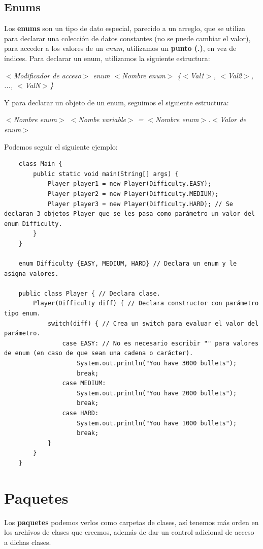 \subsection{Enums}
\hspace{0.55cm}Los \textbf{enums} son un tipo de dato especial, parecido a un arreglo, que se utiliza para declarar una colección de datos constantes (no se puede cambiar el valor), para acceder a los valores de un \textit{enum}, utilizamos un \textbf{punto (.)}, en vez de índices. Para declarar un enum, utilizamos la siguiente estructura:
\begin{center}
	\textit{$<$Modificador de acceso$>$ enum $<$Nombre enum$>$ \{$<$Val1$>$, $<$Val2$>$, ..., $<$ValN$>$\}}
\end{center}

Y para declarar un objeto de un enum, seguimos el siguiente estructura:
\begin{center}
	\textit{$<$Nombre enum$>$ $<$Nombe variable$>$ = $<$Nombre enum$>$.$<$Valor de enum$>$}
\end{center}

Podemos seguir el siguiente ejemplo:
\begin{lstlisting}
    class Main {
        public static void main(String[] args) {
            Player player1 = new Player(Difficulty.EASY);
            Player player2 = new Player(Difficulty.MEDIUM);
            Player player3 = new Player(Difficulty.HARD); // Se declaran 3 objetos Player que se les pasa como parámetro un valor del enum Difficulty.
        }
    }

    enum Difficulty {EASY, MEDIUM, HARD} // Declara un enum y le asigna valores.

    public class Player { // Declara clase.
        Player(Difficulty diff) { // Declara constructor con parámetro tipo enum.
            switch(diff) { // Crea un switch para evaluar el valor del parámetro.
                case EASY: // No es necesario escribir "" para valores de enum (en caso de que sean una cadena o carácter).
                    System.out.println("You have 3000 bullets");
                    break;
                case MEDIUM:
                    System.out.println("You have 2000 bullets");
                    break;
                case HARD:
                    System.out.println("You have 1000 bullets");
                    break;
            }
        }
    }
\end{lstlisting}



\section{Paquetes}
\hspace{0.55cm}Los \textbf{paquetes} podemos verlos como carpetas de clases, así tenemos más orden en los archivos de clases que creemos, además de dar un control adicional de acceso a dichas clases.

